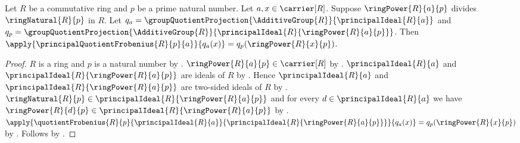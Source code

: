 \begin{proposition}\label{principal_quotient_frobenius_apply}
    Let $R$ be a commutative ring and $p$ be a prime natural number.
    Let $a,x\in\carrier[R]$.
    Suppose $\ringPower{R}{a}{p}$ divides $\ringNatural{R}{p}$ in $R$.
    Let
        $q_a=\groupQuotientProjection{\AdditiveGroup{R}}{
            \principalIdeal{R}{a}}$ and
        $q_p=\groupQuotientProjection{\AdditiveGroup{R}}{
            \principalIdeal{R}{\ringPower{R}{a}{p}}}$.
    Then
        $\apply{\principalQuotientFrobenius{R}{p}{a}}{q_a(x)}
            =q_p(\ringPower{R}{x}{p})$.
\end{proposition}
\begin{proof}
    $R$ is a ring and $p$ is a natural number by
        .
    $\ringPower{R}{a}{p}\in\carrier[R]$ by .
    $\principalIdeal{R}{a}$ and
        $\principalIdeal{R}{\ringPower{R}{a}{p}}$
        are ideals of $R$ by .
    Hence $\principalIdeal{R}{a}$ and
        $\principalIdeal{R}{\ringPower{R}{a}{p}}$
        are two-sided ideals of $R$ by .
    $\ringNatural{R}{p}
            \in\principalIdeal{R}{\ringPower{R}{a}{p}}$ and
        for every $d\in\principalIdeal{R}{a}$ we have
            $\ringPower{R}{d}{p}
                \in\principalIdeal{R}{\ringPower{R}{a}{p}}$ by
        .
    $\apply{\quotientFrobenius{R}{p}{\principalIdeal{R}{a}}{
            \principalIdeal{R}{\ringPower{R}{a}{p}}}}{q_a(x)}
        =q_p(\ringPower{R}{x}{p})$ by
        .
    Follows by .
\end{proof}

